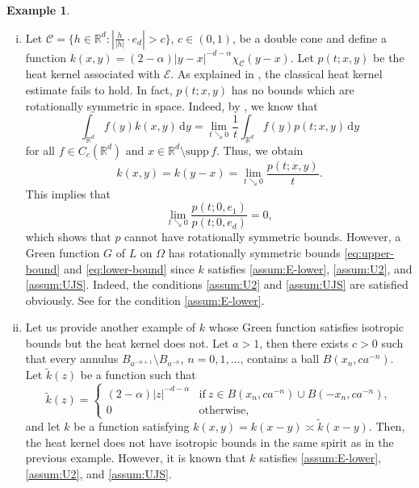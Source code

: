 \documentclass[reqno]{amsart}
\theoremstyle{plain}
\theoremstyle{definition}
\newtheorem{example}[theorem]{Example}
\numberwithin{equation}{section}
\newcommand{\Rd}{\mathbb{R}^d}
\newcommand{\dy} {\, \mathrm{d}y}
\begin{document}
\begin{example} \label{ex:examples}
\begin{enumerate}[(i)]
\item
Let $\mathcal{C} = \lbrace h \in \Rd : |\frac{h}{|h|} \cdot e_d| > c \rbrace$, $c \in (0,1)$, be a double cone and define a function $k(x, y) = (2-\alpha) |y-x|^{-d-\alpha} \chi_{\mathcal{C}}(y-x)$. Let $p(t; x, y)$ be the heat kernel associated with $\mathcal{E}$. As explained in \cite[Example 1.2]{CKW20}, the classical heat kernel estimate fails to hold. In fact, $p(t; x,y)$ has no bounds which are rotationally symmetric in space. Indeed, by \cite[Equation (2.4)]{BKK15}, we know that
\begin{equation*}
\int_{\Rd} f(y) k(x, y) \dy
= \lim_{t \searrow 0} \frac{1}{t} \int_{\Rd} f(y) p(t;x, y) \dy
\end{equation*}
for all $f \in C_c(\Rd)$ and $x \in \Rd \setminus \mathrm{supp} \, f$. Thus, we obtain
\begin{equation*}
k(x, y) = k(y-x) = \lim_{t \searrow 0} \frac{p(t; x, y)}{t}.
\end{equation*}
This implies that
\begin{equation*}
\lim_{t \searrow 0} \frac{p(t; 0, e_1)}{p(t; 0, e_d)} = 0,
\end{equation*}
which shows that $p$ cannot have rotationally symmetric bounds. However, a Green function $G$ of $L$ on $\Omega$ has rotationally symmetric bounds \eqref{eq:upper-bound} and \eqref{eq:lower-bound} since $k$ satisfies \eqref{assum:E-lower}, \eqref{assum:U2}, and \eqref{assum:UJS}. Indeed, the conditions \eqref{assum:U2} and \eqref{assum:UJS} are satisfied obviously. See \cite[Theorem 1.11]{DyKa20} for the condition \eqref{assum:E-lower}.

\item
Let us provide another example of $k$ whose Green function satisfies isotropic bounds but the heat kernel does not. Let $a > 1$, then there exists $c > 0$ such that every annulus $B_{a^{-n+1}} \setminus B_{a^{-n}}$, $n=0, 1, \dots$, contains a ball $B(x_n, ca^{-n})$. Let $\tilde{k}(z)$ be a function such that
\begin{equation*}
\tilde{k}(z) = 
\begin{cases}
(2-\alpha) |z|^{-d-\alpha} &\text{if}~ z \in B(x_n, ca^{-n}) \cup B(-x_n, ca^{-n}), \\
0 &\text{otherwise},
\end{cases}
\end{equation*}
and let $k$ be a function satisfying $k(x, y) = k(x-y) \asymp \tilde{k}(x-y)$. Then, the heat kernel does not have isotropic bounds in the same spirit as in the previous example. However,  it is known \cite[Corollary 12.5]{Sch20} that $k$ satisfies \eqref{assum:E-lower}, \eqref{assum:U2}, and \eqref{assum:UJS}.


\end{enumerate}
\end{example}
\end{document}
